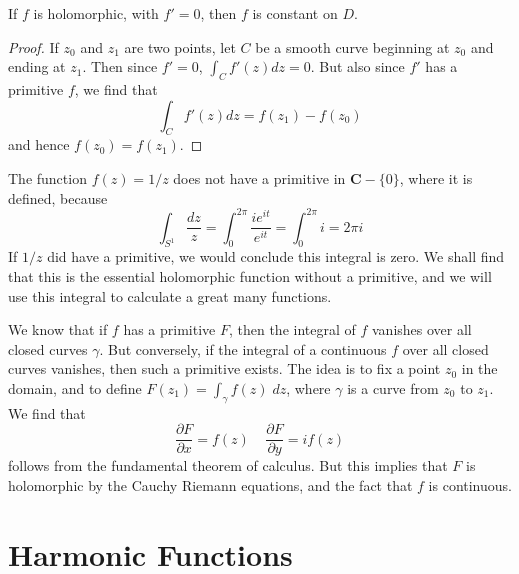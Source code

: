 \begin{corollary}
    If $f$ is holomorphic, with $f' = 0$, then $f$ is constant on $D$.
\end{corollary}
\begin{proof}
    If $z_0$ and $z_1$ are two points, let $C$ be a smooth curve beginning at $z_0$ and ending at $z_1$. Then since $f' = 0$, $\int_C f'(z) dz = 0$. But also since $f'$ has a primitive $f$, we find that
    \[ \int_C f'(z) dz = f(z_1) - f(z_0) \]
    and hence $f(z_0) = f(z_1)$.
\end{proof}

\begin{example}
    The function $f(z) = 1/z$ does not have a primitive in $\mathbf{C} - \{ 0 \}$, where it is defined, because
    \[ \int_{S^1} \frac{dz}{z} = \int_0^{2\pi} \frac{ie^{it}}{e^{it}} = \int_0^{2\pi} i = 2 \pi i \]
    If $1/z$ did have a primitive, we would conclude this integral is zero. We shall find that this is the essential holomorphic function without a primitive, and we will use this integral to calculate a great many functions.
\end{example}

We know that if $f$ has a primitive $F$, then the integral of $f$ vanishes over all closed curves $\gamma$. But conversely, if the integral of a continuous $f$ over all closed curves vanishes, then such a primitive exists. The idea is to fix a point $z_0$ in the domain, and to define $F(z_1) = \int_\gamma f(z)\; dz$, where $\gamma$ is a curve from $z_0$ to $z_1$. We find that
%
\[ \frac{\partial F}{\partial x} = f(z)\ \ \ \ \ \frac{\partial F}{\partial y} = i f(z) \]
%
follows from the fundamental theorem of calculus. But this implies that $F$ is holomorphic by the Cauchy Riemann equations, and the fact that $f$ is continuous.







\section{Harmonic Functions}

